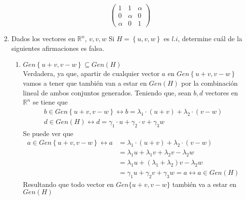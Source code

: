 \documentclass{article}
\begin{document}
\begin{enumerate}
\[\begin{aligned}
            \end{aligned}
            \begin{pmatrix}
                1 & 1 & \alpha \\
                0 & \alpha & 0 \\
                \alpha & 0 & 1
            \end{pmatrix}
        \]
    \setcounter{enumi}{22}
    \item Dados los vectores en \(\mathbb{R}^n\), \(v, v, w\) Si \(H = \left\{u, v, w\right\}\) es \(l.i\), determine cuál de la siguientes afirmaciones es falsa.
        \begin{enumerate}[label=\listAlph]
            \item \(Gen\left\{u + v, v − w\right\} \subseteq Gen\left(H\right)\) \\
                Verdadera, ya que,
                apartir de cualquier vector \(a\) en \(Gen\left\{u + v, v - w\right\}\) vamos a tener que también van a estar en \(Gen\left(H\right)\)
                por la combinación lineal de ambos conjuntos generados.
                Teniendo que, sean \(b, d\) vectores en \(\mathbb{R}^n\) se tiene que
                \[
                    \begin{gathered}
                        b \in Gen\left\{u + v, v - w\right\} \leftrightarrow b = \lambda_1 \cdot \left(u + v\right) + \lambda_2 \cdot \left(v - w\right) \\
                        d \in Gen\left(H\right) \leftrightarrow d = \gamma_1 \cdot u + \gamma_2 \cdot v + \gamma_3 w
                    \end{gathered}
                \]
                Se puede ver que
                \[
                    \begin{aligned}
                        a \in Gen\left\{u + v, v - w\right\} \leftrightarrow
                        a &= \lambda_1 \cdot \left(u + v\right) + \lambda_2 \cdot \left(v - w\right) \\
                        &= \lambda_1u + \lambda_1v + \lambda_2v - \lambda_2w \\
                        &= \lambda_1u + \left(\lambda_1 + \lambda_2\right)v - \lambda_2w \\
                        &= \gamma_1u + \gamma_2v + \gamma_3w = a \leftrightarrow
                        a \in Gen\left(H\right)
                    \end{aligned}
                \]
                Resultando que todo vector en \(Gen\{u + v, v - w\}\) también va a estar en \(Gen(H)\)

\end{enumerate}
\end{enumerate}
\end{document}
